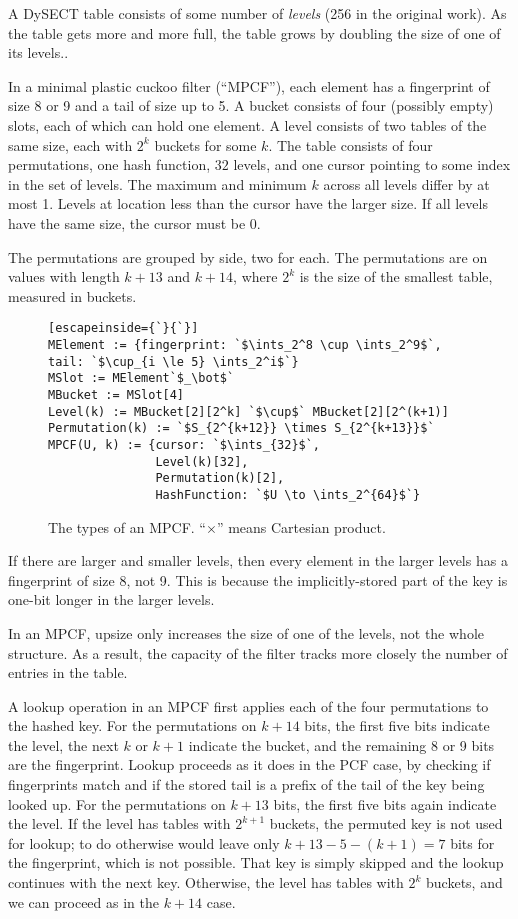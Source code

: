 \documentclass[letterpaper, 11pt]{article}
\newcommand{\ints}{\mathbb{Z}}
\begin{document}
A DySECT table consists of some number of {\em levels} (256 in the original work).
As the table gets more and more full, the table grows by doubling the size of one of its levels..

In a minimal plastic cuckoo filter (``MPCF''), each element has a fingerprint of size 8 or 9 and a tail of size up to 5.
A bucket consists of four (possibly empty) slots, each of which can hold one element.
A level consists of two tables of the same size, each with $2^k$ buckets for some $k$.
The table consists of four permutations, one hash function, $32$ levels, and one cursor pointing to some index in the set of levels.
The maximum and minimum $k$ across all levels differ by at most 1.
Levels at location less than the cursor have the larger size.
If all levels have the same size, the cursor must be 0.

The permutations are grouped by side, two for each.
The permutations are on values with length $k + 13$ and $k + 14$, where $2^k$ is the size of the smallest table, measured in buckets.

\begin{figure}
\begin{lstlisting}[escapeinside={`}{`}]
MElement := {fingerprint: `$\ints_2^8 \cup \ints_2^9$`, tail: `$\cup_{i \le 5} \ints_2^i$`}
MSlot := MElement`$_\bot$`
MBucket := MSlot[4]
Level(k) := MBucket[2][2^k] `$\cup$` MBucket[2][2^(k+1)]
Permutation(k) := `$S_{2^{k+12}} \times S_{2^{k+13}}$`
MPCF(U, k) := {cursor: `$\ints_{32}$`,
               Level(k)[32],
               Permutation(k)[2],
               HashFunction: `$U \to \ints_2^{64}$`}

\end{lstlisting}
\caption{The types of an MPCF.
``$\times$'' means Cartesian product.
}
\end{figure}

If there are larger and smaller levels, then every element in the larger levels has a fingerprint of size 8, not 9.
This is because the implicitly-stored part of the key is one-bit longer in the larger levels.

In an MPCF, upsize only increases the size of one of the levels, not the whole structure.
As a result, the capacity of the filter tracks more closely the number of entries in the table.

A lookup operation in an MPCF first applies each of the four permutations to the hashed key.
For the permutations on $k + 14$ bits, the first five bits indicate the level, the next $k$ or $k+1$ indicate the bucket, and the remaining 8 or 9 bits are the fingerprint.
Lookup proceeds as it does in the PCF case, by checking if fingerprints match and if the stored tail is a prefix of the tail of the key being looked up.
For the permutations on $k + 13$ bits, the first five bits again indicate the level.
If the level has tables with $2^{k+1}$ buckets, the permuted key is not used for lookup; to do otherwise would leave only $k+13 - 5 - (k+1) = 7$ bits for the fingerprint, which is not possible.
That key is simply skipped and the lookup continues with the next key. %
Otherwise, the level has tables with $2^k$ buckets, and we can proceed as in the $k+14$ case.
\end{document}
